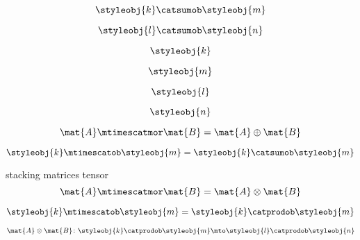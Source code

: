 \begin{forslides}
    \begin{equation}
        \label{eq:combination-030}
        \styleobj{k} \catsumob \styleobj{m}
    \end{equation}

    \begin{equation}
        \label{eq:combination-031}
        \styleobj{l} \catsumob \styleobj{n}
    \end{equation}

    \begin{equation}
        \label{eq:combination-032}
        \styleobj{k}
    \end{equation}

    \begin{equation}
        \label{eq:combination-033}
        \styleobj{m}
    \end{equation}

    \begin{equation}
        \label{eq:combination-034}
        \styleobj{l}
    \end{equation}

    \begin{equation}
        \label{eq:combination-035}
       \styleobj{n}
    \end{equation}

    \begin{equation}
        \label{eq:combination-036}
         \mat{A} \mtimescatmor \mat{B} = \mat{A} \oplus \mat{B}
    \end{equation}

    \begin{equation}
        \label{eq:combination-037}
       \styleobj{k} \mtimescatob \styleobj{m} = \styleobj{k} \catsumob \styleobj{m}
    \end{equation}

stacking matrices tensor
    \begin{equation}
        \label{eq:combination-038}
        \mat{A} \mtimescatmor \mat{B} = \mat{A} \otimes \mat{B}
    \end{equation}

    \begin{equation}
        \label{eq:combination-039}
       \styleobj{k} \mtimescatob \styleobj{m} = \styleobj{k} \catprodob \styleobj{m}
    \end{equation}

    \begin{equation}
        \label{eq:combination-040}
       \mat{A} \otimes \mat{B} \colon \styleobj{k} \catprodob \styleobj{m} \mto \styleobj{l} \catprodob \styleobj{n}
    \end{equation}


\end{forslides}
